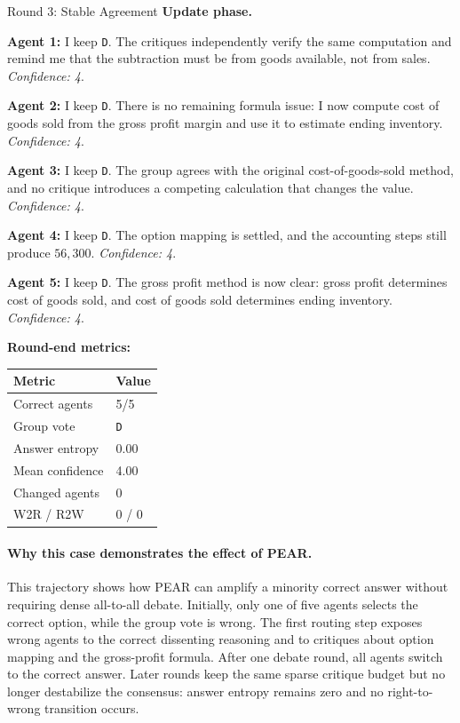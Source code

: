 \begin{roundbox}{Round 3: Stable Agreement}
\textbf{Update phase.}

\textbf{Agent 1:} I keep \texttt{D}. The critiques independently verify the same computation and remind me that the subtraction must be from goods available, not from sales. \textit{Confidence: 4}.

\textbf{Agent 2:} I keep \texttt{D}. There is no remaining formula issue: I now compute cost of goods sold from the gross profit margin and use it to estimate ending inventory. \textit{Confidence: 4}.

\textbf{Agent 3:} I keep \texttt{D}. The group agrees with the original cost-of-goods-sold method, and no critique introduces a competing calculation that changes the value. \textit{Confidence: 4}.

\textbf{Agent 4:} I keep \texttt{D}. The option mapping is settled, and the accounting steps still produce $56{,}300$. \textit{Confidence: 4}.

\textbf{Agent 5:} I keep \texttt{D}. The gross profit method is now clear: gross profit determines cost of goods sold, and cost of goods sold determines ending inventory. \textit{Confidence: 4}.

\vspace{1mm}
\textbf{Round-end metrics:}
\begin{center}
\footnotesize
\begin{tabular}{@{}ll@{}}
\toprule
Metric & Value \\
\midrule
Correct agents & 5/5 \\
Group vote & \texttt{D} \\
Answer entropy & 0.00 \\
Mean confidence & 4.00 \\
Changed agents & 0 \\
W2R / R2W & 0 / 0 \\
\bottomrule
\end{tabular}
\end{center}

\end{roundbox}

\paragraph{Why this case demonstrates the effect of PEAR.}
This trajectory shows how PEAR can amplify a minority correct answer without requiring dense all-to-all debate. Initially, only one of five agents selects the correct option, while the group vote is wrong. The first routing step exposes wrong agents to the correct dissenting reasoning and to critiques about option mapping and the gross-profit formula. After one debate round, all agents switch to the correct answer. Later rounds keep the same sparse critique budget but no longer destabilize the consensus: answer entropy remains zero and no right-to-wrong transition occurs.

